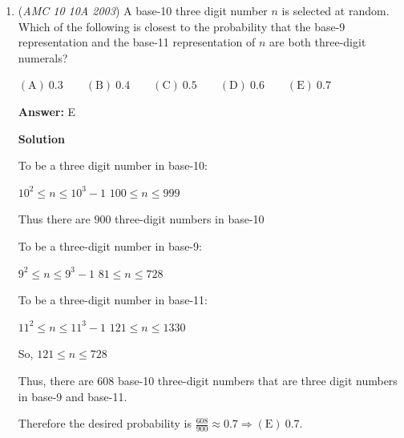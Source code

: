\begin{enumerate}
 The area of the smaller semicircle is $[A+B] = \frac{1}{2}\pi\cdot\left(\frac{1}{2}\right)^{2}=\frac{1}{8}\pi$. 

 Since the radius of the larger semicircle is equal to the diameter of the smaller half circle, the triangle is an equilateral triangle and the sector measures $60^\circ$. 

 The area of the $60^\circ$ sector of the larger semicircle is $[B+C] = \frac{60}{360}\pi\cdot\left(\frac{2}{2}\right)^{2}=\frac{1}{6}\pi$. 

 The area of the triangle is $[C] = \frac{1^{2}\sqrt{3}}{4}=\frac{\sqrt{3}}{4}$.

 So the shaded area is $[A] = [A+B]-[B+C]+[C] = \left(\frac{1}{8}\pi\right)-\left(\frac{1}{6}\pi\right)+\left(\frac{\sqrt{3}}{4}\right)=\boxed{\mathrm{(C)}\ \frac{\sqrt{3}}{4}-\frac{1}{24}\pi}$. We have thus solved the problem.

 


	\item (\textit{AMC 10 10A 2003}) A base-10 three digit number $n$ is selected at random. Which of the following is closest to the probability that the base-9 representation and the base-11 representation of $n$ are both three-digit numerals? 


 $\mathrm{(A) \ } 0.3\qquad \mathrm{(B) \ } 0.4\qquad \mathrm{(C) \ } 0.5\qquad \mathrm{(D) \ } 0.6\qquad \mathrm{(E) \ } 0.7$

 \textbf{Answer: }E



\textbf{Solution}

To be a three digit number in base-10:  

 $10^{2} \leq n \leq 10^{3}-1$
$100 \leq n \leq 999$ 

 Thus there are $900$ three-digit numbers in base-10

 To be a three-digit number in base-9:  

 $9^{2} \leq n \leq 9^{3}-1$
$81 \leq n \leq 728$

 To be a three-digit number in base-11:  

 $11^{2} \leq n \leq 11^{3}-1$
$121 \leq n \leq 1330$

 So, $121 \leq n \leq 728$ 

 Thus, there are $608$ base-10 three-digit numbers that are three digit numbers in base-9 and base-11. 

 Therefore the desired probability is $\frac{608}{900}\approx 0.7 \Rightarrow\boxed{\mathrm{(E)}\ 0.7}$.


\end{enumerate}
